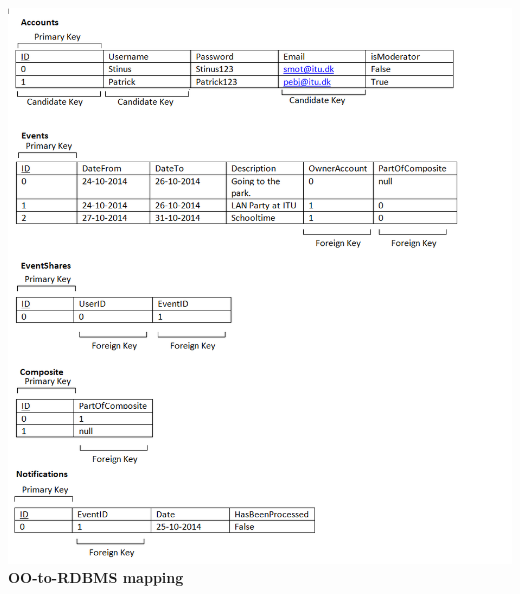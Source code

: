 \documentclass[a4paper]{article}
\begin{document}
\begin{table}
\centering
	\includegraphics[width=1.3\textwidth]{tables.png}\\
\caption{\textbf{OO-to-RDBMS mapping}}
\end{table}
\end{document}
